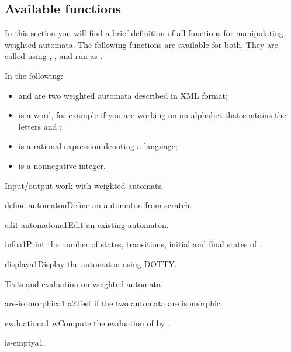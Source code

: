 
\subsection{Available functions}

In this section you will find a brief definition of all functions for
manipulating weighted automata. The following functions are available
for both.  They are called using ,
, and  run as
.

\smallskip

In the following:

\begin{itemize}
\item {} and  are two weighted automata described in
  \Vauc XML format;
\item {} is a word, for example  if you are working on
  an alphabet that contains the letters  and ;
\item {} is a rational expression denoting a language;
\item {} is a nonnegative integer.
\end{itemize}


\begin{fnsection}{Input/output work with weighted automata}
\item{define-automaton}{}{Define an automaton from scratch.}
\item{edit-automaton}{a1}{Edit an existing automaton.}
\item{info}{a1}{Print the number of states, transitions, initial and
    final states of .}
\item{display}{a1}{Display the automaton using DOTTY.}  \hline
\end{fnsection}

\begin{fnsection}{Tests and evaluation on weighted automata}
\item{are-isomorphic}{a1 a2}{Test if the two automata are isomorphic.}
\item{evaluation}{a1 w}{Compute the evaluation of  by
    .}
\item{is-empty}{a1}{.}  \hline
\end{fnsection}

